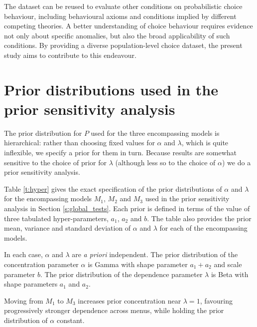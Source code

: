 \documentclass[11pt,letter]{article}
\newcommand{\menus}{menus}
\begin{document}
The dataset can be reused to evaluate other conditions on probabilistic choice behaviour, including behavioural axioms and conditions implied by different competing theories. 
A better understanding of choice behaviour requires evidence not only about specific anomalies, but also the broad applicability of such conditions.
By providing a diverse population-level choice dataset, the present study aims to contribute to this endeavour.

\appendix

\section{Prior distributions used in the prior sensitivity analysis}\label{s:prior}

The prior distribution for $P$ used for the three encompassing models is hierarchical: rather than choosing fixed values for $\alpha$ and $\lambda$, which is quite inflexible, we specify a prior for them in turn.
Because results are somewhat sensitive to the choice of prior for $\lambda$ (although less so to the choice of $\alpha$) we do a prior sensitivity analysis.

Table \ref{t:hyper} gives the exact specification of the prior distributions of $\alpha$ and $\lambda$ for the encompassing models $M_1$, $M_2$ and $M_3$ used in the prior sensitivity analysis in Section \ref{s:global_tests}.
Each prior is defined in terms of the value of three tabulated hyper-parameters, $a_1$, $a_2$ and $b$.
The table also provides the prior mean, variance and standard deviation of $\alpha$ and $\lambda$ for each of the encompassing models.

In each case, $\alpha$ and $\lambda$ are {\em a priori} independent.
The prior distribution of the concentration parameter $\alpha$ is Gamma with shape parameter $a_1 + a_2$ and scale parameter $b$.
The prior distribution of the dependence parameter $\lambda$ is Beta with shape parameters $a_1$ and $a_2$.

Moving from $M_1$ to $M_3$ increases prior concentration near $\lambda = 1$, favouring progressively stronger dependence across \menus{}, while holding the prior distribution of $\alpha$ constant.
\end{document}
